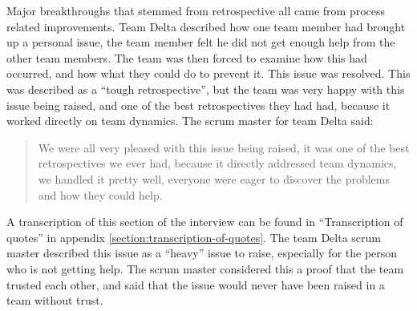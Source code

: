 \label{question-21}
Major breakthroughs that stemmed from retrospective all came from process related improvements. Team Delta described how one team member had brought up a personal issue, the team member felt he did not get enough help from the other team members. The team was then forced to examine how this had occurred, and how what they could do to prevent it. This issue was resolved. This was described as a ``tough retrospective'', but the team was very happy with this issue being raised, and one of the best retrospectives they had had, because it worked directly on team dynamics. The scrum master for team Delta said:

\begin{quote}
We were all very pleased with this issue being raised, it was one of the best retrospectives we ever had, because it directly addressed team dynamics, we handled it pretty well, everyone were eager to discover the problems and how they could help.
\end{quote}

A transcription of this section of the interview can be found in ``Transcription of quotes'' in appendix \autoref{section:transcription-of-quotes}.
The team Delta scrum master described this issue as a ``heavy'' issue to raise, especially for the person who is not getting help. The scrum master considered this a proof that the team trusted each other, and said that the issue would never have been raised in a team without trust.